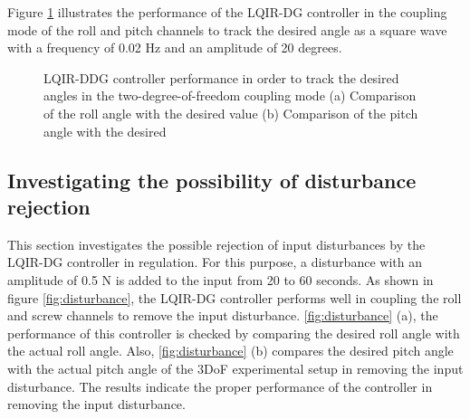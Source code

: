 \documentclass[3p,times]{elsarticle}
\begin{document}
Figure \ref{fig:square} illustrates the performance of the LQIR-DG controller in the coupling mode of the roll and pitch channels to track the desired angle as a square wave with a frequency of 0.02 Hz and an amplitude of 20 degrees.


\begin{figure}[!ht]
	\centering
	\caption{LQIR-DDG controller performance in order to track the desired angles in the two-degree-of-freedom coupling mode (a) Comparison of the roll angle with the desired value (b) Comparison of the pitch angle with the desired}
	\label{fig:square}
\end{figure}

\subsection{Investigating the possibility of disturbance rejection}

\noindent This section investigates the possible rejection of input disturbances by the LQIR-DG controller in regulation. For this purpose, a disturbance with an amplitude of 0.5 N is added to the input from 20 to 60 seconds. As shown in figure \ref{fig:disturbance}, the LQIR-DG controller performs well in coupling the roll and screw channels to remove the input disturbance. \ref{fig:disturbance} (a), the performance of this controller is checked by comparing the desired roll angle with the actual roll angle. Also, \ref{fig:disturbance}  (b) compares the desired pitch angle with the actual pitch angle of the 3DoF experimental setup in removing the input disturbance. The results indicate the proper performance of the controller in removing the input disturbance.
\end{document}
